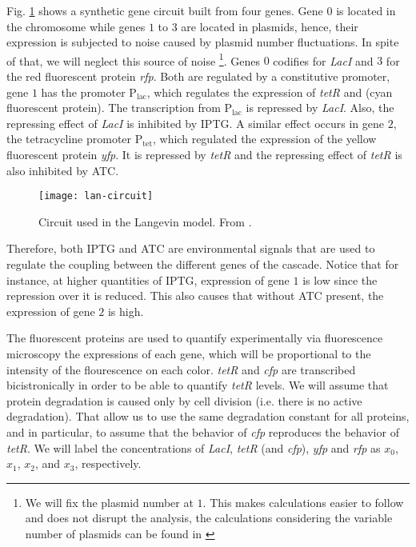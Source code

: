 Fig. \ref{fig:lan-circuit} shows a synthetic gene circuit built from four genes. Gene $0$ is located in the chromosome while genes $1$ to $3$ are located in plasmids, hence, their expression is subjected to noise caused by plasmid number fluctuations. In spite of that, we will neglect this source of noise \footnote{We will fix the plasmid number at $1$. This makes calculations easier to follow and does not disrupt the analysis, the calculations considering the variable number of plasmids can be found in \cite{pedraza05}}. Genes $0$ codifies for \textit{LacI} and $3$ for the red fluorescent protein \textit{rfp}. Both are regulated by a constitutive promoter, gene $1$ has the promoter P$_\text{lac}$, which regulates the expression of \textit{tetR} and  (cyan fluorescent protein). The transcription from P$_\text{lac}$ is repressed by \textit{LacI}. Also, the repressing effect of \textit{LacI} is inhibited by IPTG. A similar effect occurs in gene $2$, the tetracycline promoter P$_\text{tet}$, which regulated the expression of the yellow fluorescent protein \textit{yfp}. It is repressed by \textit{tetR} and the repressing effect of \textit{tetR} is also inhibited by ATC.

\begin{figure}[H]
  \centering
  \texttt{[image: lan-circuit]}
  \caption[Circuit used for the Langevin model]{\label{fig:lan-circuit} Circuit used in the Langevin model. From \cite{pedraza05}.}
\end{figure}

Therefore, both IPTG and ATC are environmental signals that are used to regulate the coupling between the different genes of the cascade. Notice that for instance, at higher quantities of IPTG, expression of gene $1$ is low since the repression over it is reduced. This also causes that without ATC present, the expression of gene $2$ is high. 

The fluorescent proteins are used to quantify experimentally via fluorescence microscopy the expressions of each gene, which will be proportional to the intensity of the flourescence on each color. \textit{tetR} and \textit{cfp} are transcribed bicistronically in order to be able to quantify \textit{tetR} levels. We will assume that protein degradation is caused only by cell division (i.e. there is no active degradation). That allow us to use the same degradation constant for all proteins, and in particular, to assume that the behavior of \textit{cfp} reproduces the behavior of \textit{tetR}. We will label the concentrations of \textit{LacI}, \textit{tetR} (and \textit{cfp}), \textit{yfp} and \textit{rfp} as $x_0$, $x_1$, $x_2$, and $x_3$, respectively.


